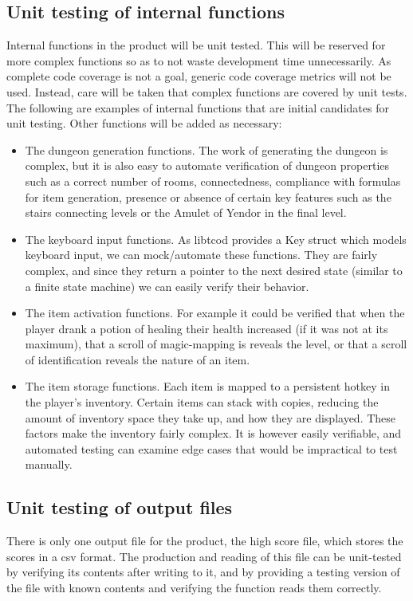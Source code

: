 \documentclass[12pt, titlepage]{article}
\begin{document}
	\subsection{Unit testing of internal functions}
		Internal functions in the product will be unit tested. This will be reserved for more complex functions so as to not waste development time unnecessarily. As complete code coverage is not a goal, generic code coverage metrics will not be used. Instead, care will be taken that complex functions are covered by unit tests. The following are examples of internal functions that are initial candidates for unit testing. Other functions will be added as necessary:
		\begin{itemize}
			\item The dungeon generation functions. The work of generating the dungeon is complex, but it is also easy to automate verification of dungeon properties such as a correct number of rooms, connectedness, compliance with formulas for item generation, presence or absence of certain key features such as the stairs connecting levels or the Amulet of Yendor in the final level.
			\item The keyboard input functions. As libtcod provides a Key struct which models keyboard input, we can mock/automate these functions. They are fairly complex, and since they return a pointer to the next desired state (similar to a finite state machine) we can easily verify their behavior.
			\item The item activation functions. For example it could be verified that when the player drank a potion of healing their health increased (if it was not at its maximum), that a scroll of magic-mapping is reveals the level, or that a scroll of identification reveals the nature of an item.
			\item The item storage functions. Each item is mapped to a persistent hotkey in the player's inventory. Certain items can stack with copies, reducing the amount of inventory space they take up, and how they are displayed. These factors make the inventory fairly complex. It is however easily verifiable, and automated testing can examine edge cases that would be impractical to test manually.
		\end{itemize}

	\subsection{Unit testing of output files}
		There is only one output file for the product, the high score file, which stores the scores in a csv format. The production and reading of this file can be unit-tested by verifying its contents after writing to it, and by providing a testing version of the file with known contents and verifying the function reads them correctly.
\end{document}
